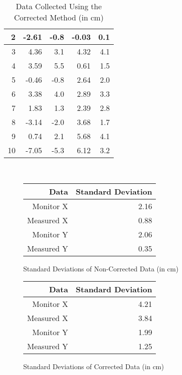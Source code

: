 \documentclass[letterpaper,12pt]{article}
\begin{document}
{\begin{table}[h]
\begin{tabular}{|r|r|r|r|r|}
    2     & -2.61     & -0.8       & -0.03     & 0.1        \\ \hline
    3     & 4.36      & 3.1        & 4.32      & 4.1        \\ \hline
    4     & 3.59      & 5.5        & 0.61      & 1.5        \\ \hline
    5     & -0.46     & -0.8       & 2.64      & 2.0        \\ \hline
    6     & 3.38      & 4.0        & 2.89      & 3.3        \\ \hline
    7     & 1.83      & 1.3        & 2.39      & 2.8        \\ \hline
    8     & -3.14     & -2.0       & 3.68      & 1.7        \\ \hline
    9     & 0.74      & 2.1        & 5.68      & 4.1        \\ \hline
    10    & -7.05     & -5.3       & 6.12      & 3.2        \\ \hline
    \end{tabular}
    \caption {Data Collected Using the Corrected Method (in cm)}
\end{table}
\mbox{}\\
\begin{figure}[h]
  \centering
  \begin{minipage}{2.5in}
    \begin{tabular}{|r|r|}
    \hline
    Data       & Standard Deviation  \\ \hline
    Monitor X  & 2.16                \\ \hline
    Measured X & 0.88                \\ \hline
    Monitor Y  & 2.06                \\ \hline
    Measured Y & 0.35                \\ \hline
    \end{tabular}
    \caption {Standard Deviations of Non-Corrected Data (in cm)}
  \end{minipage}
  \qquad
  \begin{minipage}{2.5in}
    \begin{tabular}{|r|r|}
    \hline
    Data       & Standard Deviation  \\ \hline
    Monitor X  & 4.21                \\ \hline
    Measured X & 3.84                \\ \hline
    Monitor Y  & 1.99                \\ \hline
    Measured Y & 1.25                \\ \hline
    \end{tabular}
    \caption {Standard Deviations of Corrected Data (in cm)}
  \end{minipage}
\end{figure}
}
\end{document}

